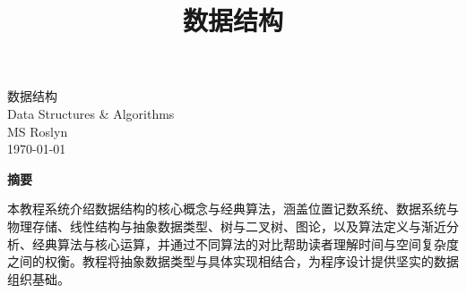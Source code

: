 \documentclass[12pt,a4paper]{ctexrep}
\title{\textbf{\huge 数据结构}}
\author{}
\date{}
\begin{document}
\clearpage
\thispagestyle{empty}
\vspace*{\fill}

\begin{center}
{\huge 数据结构}\\[0.8em]
{\large Data Structures \& Algorithms}\\[2.5em]
{\large MS Roslyn}\\[0.6em]
{\large \today}
\end{center}

\vspace{2.5em}

\begin{center}
{\bfseries 摘要}
\end{center}

\vspace{1em}

\begin{center}
本教程系统介绍数据结构的核心概念与经典算法，涵盖位置记数系统、数据系统与物理存储、线性结构与抽象数据类型、树与二叉树、图论，以及算法定义与渐近分析、经典算法与核心运算，并通过不同算法的对比帮助读者理解时间与空间复杂度之间的权衡。教程将抽象数据类型与具体实现相结合，为程序设计提供坚实的数据组织基础。
\end{center}

\vspace*{\fill}
\clearpage

\tableofcontents
\newpage

\clearpage

\clearpage

\clearpage

\clearpage

\clearpage

\clearpage

\clearpage

\clearpage

\end{document}
